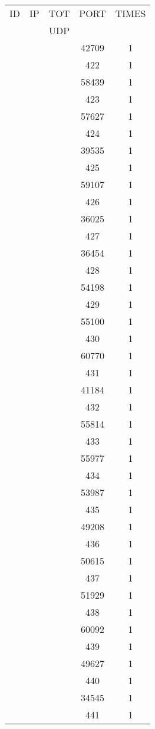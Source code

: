 \documentclass[a4paper]{scrartcl}
\begin{document}
\begin{minipage}[b]{0.5\linewidth}
\begin{tabular}{| c | c | c | c | c |}
\hline
ID & IP & TOT & PORT & TIMES \\ 
   &    & UDP &      &       \\ 
\hline
& & & 42709 & 1 \\ & & & 422 & 1 \\ & & & 58439 & 1 \\ & & & 423 & 1 \\ & & & 57627 & 1 \\ & & & 424 & 1 \\ & & & 39535 & 1 \\ & & & 425 & 1 \\ & & & 59107 & 1 \\ & & & 426 & 1 \\ & & & 36025 & 1 \\ & & & 427 & 1 \\ & & & 36454 & 1 \\ & & & 428 & 1 \\ & & & 54198 & 1 \\ & & & 429 & 1 \\ & & & 55100 & 1 \\ & & & 430 & 1 \\ & & & 60770 & 1 \\ & & & 431 & 1 \\ & & & 41184 & 1 \\ & & & 432 & 1 \\ & & & 55814 & 1 \\ & & & 433 & 1 \\ & & & 55977 & 1 \\ & & & 434 & 1 \\ & & & 53987 & 1 \\ & & & 435 & 1 \\ & & & 49208 & 1 \\ & & & 436 & 1 \\ & & & 50615 & 1 \\ & & & 437 & 1 \\ & & & 51929 & 1 \\ & & & 438 & 1 \\ & & & 60092 & 1 \\ & & & 439 & 1 \\ & & & 49627 & 1 \\ & & & 440 & 1 \\ & & & 34545 & 1 \\ & & & 441 & 1 \\ \hline\end{tabular}\end{minipage} \hfill\begin{minipage}[b]{0.5\linewidth}\begin{tabular}{| c | c | c | c | c |}

\end{tabular}
\end{minipage}
\end{document}
